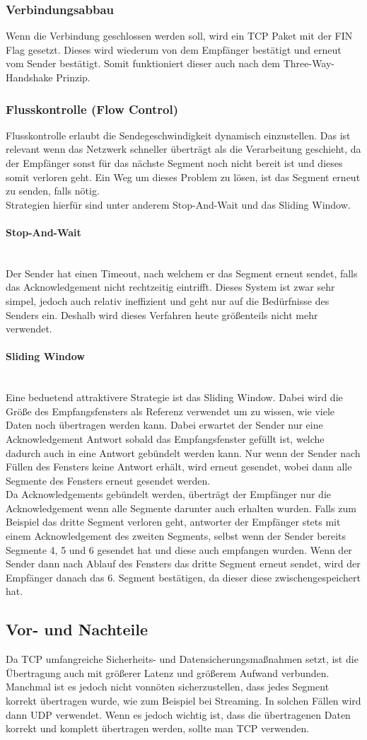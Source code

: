 \documentclass{article}
\newcommand{\paragraphlb}[1]{\paragraph{#1}\mbox{}\\}
\begin{document}
	 \subsubsection{Verbindungsabbau}
	 Wenn die Verbindung geschlossen werden soll, wird ein TCP Paket mit der FIN Flag gesetzt. Dieses wird wiederum von dem Empfänger bestätigt und erneut vom Sender bestätigt. Somit funktioniert dieser auch nach dem Three-Way-Handshake Prinzip. 
	 \subsubsection{Flusskontrolle (Flow Control)}
	 Flusskontrolle erlaubt die Sendegeschwindigkeit dynamisch einzustellen. Das ist relevant wenn das Netzwerk schneller überträgt als die Verarbeitung geschieht, da der Empfänger sonst für das nächste Segment noch nicht bereit ist und dieses somit verloren geht. Ein Weg um dieses Problem zu lösen, ist das Segment erneut zu senden, falls nötig. \\
	 Strategien hierfür sind unter anderem Stop-And-Wait und das Sliding Window.
	 \paragraphlb{Stop-And-Wait}
	 Der Sender hat einen Timeout, nach welchem er das Segment erneut sendet, falls das Acknowledgement nicht rechtzeitig eintrifft. Dieses System ist zwar sehr simpel, jedoch auch relativ ineffizient und geht nur auf die Bedürfnisse des Senders ein. Deshalb wird dieses Verfahren heute größenteils nicht mehr verwendet.
	 \paragraphlb{Sliding Window}
	 Eine beduetend attraktivere Strategie ist das Sliding Window. Dabei wird die Größe des Empfangsfensters als Referenz verwendet um zu wissen, wie viele Daten noch übertragen werden kann. Dabei erwartet der Sender nur eine Acknowledgement Antwort sobald das Empfangsfenster gefüllt ist, welche dadurch auch in eine Antwort gebündelt werden kann. Nur wenn der Sender nach Füllen des Fensters keine Antwort erhält, wird erneut gesendet, wobei dann alle Segmente des Fensters erneut gesendet werden. \\
	 Da Acknowledgements gebündelt werden, überträgt der Empfänger nur die Acknowledgement wenn alle Segmente darunter auch erhalten wurden. Falls zum Beispiel das dritte Segment verloren geht, antworter der Empfänger stets mit einem Acknowledgement des zweiten Segments, selbst wenn der Sender bereits Segmente 4, 5 und 6 gesendet hat und diese auch empfangen wurden. Wenn der Sender dann nach Ablauf des Fensters das dritte Segment erneut sendet, wird der Empfänger danach das 6. Segment bestätigen, da dieser diese zwischengespeichert hat.
	 \subsection{Vor- und Nachteile}
	 Da TCP umfangreiche Sicherheits- und Datensicherungsmaßnahmen setzt, ist die Übertragung auch mit größerer Latenz und größerem Aufwand verbunden. Manchmal ist es jedoch nicht vonnöten sicherzustellen, dass jedes Segment korrekt übertragen wurde, wie zum Beispiel bei Streaming. In solchen Fällen wird dann UDP verwendet. Wenn es jedoch wichtig ist, dass die übertragenen Daten korrekt und komplett übertragen werden, sollte man TCP verwenden. 
\end{document}
